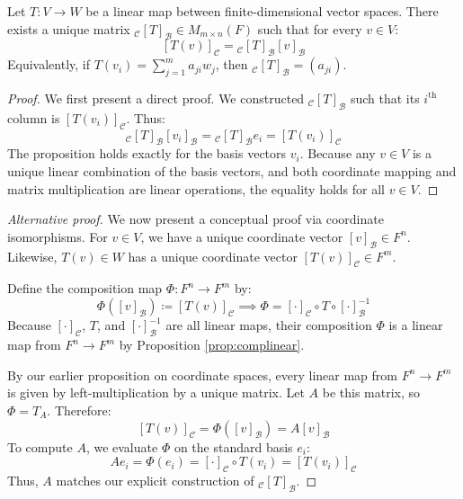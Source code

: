 \documentclass[../linear_algebra_and_groups.tex]{subfiles}
\begin{document}
\begin{proposition}
    \begin{shaded*}
        Let $T:V\to W$ be a linear map between finite-dimensional vector spaces. There exists a unique matrix ${}_{\mathcal{C}}[T]_{\mathcal{B}}\in M_{m\times n}(F)$ such that for every $v\in V$:
        \[ [T(v)]_{\mathcal{C}} = {}_{\mathcal{C}}[T]_{\mathcal{B}}[v]_\mathcal{B} \]
        Equivalently, if $T(v_i) = \sum_{j=1}^m a_{ji}w_j$, then ${}_{\mathcal{C}}[T]_{\mathcal{B}} = (a_{ji})$.
    \end{shaded*}
\end{proposition}
\begin{proof}
    We first present a direct proof. We constructed ${}_{\mathcal{C}}[T]_{\mathcal{B}}$ such that its $i^{\mathrm{th}}$ column is $[T(v_i)]_\mathcal{C}$. Thus:
    \[ {}_{\mathcal{C}}[T]_{\mathcal{B}}[v_i]_\mathcal{B} = {}_{\mathcal{C}}[T]_{\mathcal{B}} e_i = [T(v_i)]_\mathcal{C} \]
    The proposition holds exactly for the basis vectors $v_i$. Because any $v\in V$ is a unique linear combination of the basis vectors, and both coordinate mapping and matrix multiplication are linear operations, the equality holds for all $v \in V$.
    \qedhere
\end{proof}

\begin{proof}[Alternative proof]
    We now present a conceptual proof via coordinate isomorphisms. For $v\in V$, we have a unique coordinate vector $[v]_\mathcal{B} \in F^n$. Likewise, $T(v) \in W$ has a unique coordinate vector $[T(v)]_\mathcal{C} \in F^m$. 
    
    Define the composition map $\Phi:F^n\to F^m$ by:
    \[ \Phi([v]_{\mathcal{B}}) \coloneqq [T(v)]_\mathcal{C} \implies \Phi = [\cdot ]_\mathcal{C} \circ T \circ [\cdot]^{-1}_\mathcal{B} \]
    Because $[\cdot]_\mathcal{C}$, $T$, and $[\cdot]^{-1}_\mathcal{B}$ are all linear maps, their composition $\Phi$ is a linear map from $F^n \to F^m$ by Proposition \ref{prop:complinear}. 
    
    By our earlier proposition on coordinate spaces, every linear map from $F^n \to F^m$ is given by left-multiplication by a unique matrix. Let $A$ be this matrix, so $\Phi = T_A$. Therefore:
    \[ [T(v)]_\mathcal{C} = \Phi([v]_\mathcal{B}) = A[v]_\mathcal{B} \]
    To compute $A$, we evaluate $\Phi$ on the standard basis $e_i$:
    \[ A e_i = \Phi(e_i) = [\cdot ]_\mathcal{C} \circ T (v_i) = [T(v_i)]_\mathcal{C} \]
    Thus, $A$ matches our explicit construction of ${}_{\mathcal{C}}[T]_{\mathcal{B}}$.
    \qedhere
\end{proof}
\end{document}
